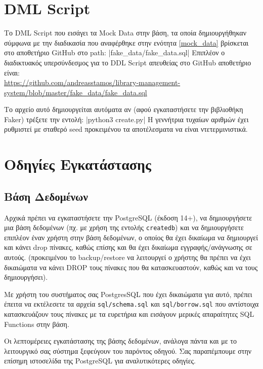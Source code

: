 \documentclass[a4paper]{article}
\begin{document}
\inputminted[breaklines,linenos]{sql}{../../sql/schema.sql}

\section{DML Script}

\par Το DML Script που εισάγει τα Mock Data στην βάση, τα οποία δημιουργήθηκαν σύμφωνα με την διαδικασία που αναφέρθηκε στην ενότητα \ref{mock_data} βρίσκεται στο αποθετήριο GitHub στο path:
|fake_data/fake_data.sql|
Επιπλέον ο διαδικτυακός υπερσύνδεσμος για το DDL Script απευθείας στο GitHub αποθετήριο είναι:\\
\url{https://github.com/andreasstamos/library-management-system/blob/master/fake_data/fake_data.sql}

\par Το αρχείο αυτό δημιουργείται αυτόματα αν (αφού εγκαταστήσετε την βιβλιοθήκη Faker) τρέξετε την εντολή:
|python3 create.py|
Η γεννήτρια τυχαίων αριθμών έχει ρυθμιστεί με σταθερό seed προκειμένου τα αποτέλεσματα να είναι ντετερμινιστικά.

\section{Οδηγίες Εγκατάστασης}

\subsection{Βάση Δεδομένων}
\label{install_db}
\par Αρχικά πρέπει να εγκαταστήσετε την PostgreSQL (έκδοση 14+), να δημιουργήσετε μια βάση δεδομένων (πχ. με χρήση της εντολής \texttt{createdb}) και να δημιουργήσετε επιπλέον έναν χρήστη στην βάση δεδομένων, ο οποίος θα έχει δικαίωμα να δημιουργεί και κάνει drop πίνακες, καθώς επίσης και θα έχει δικαίωμα εγγραφής/ανάγνωσης σε αυτούς. (προκειμένου το backup/restore να λειτουργεί ο χρήστης θα πρέπει να έχει δικαιώματα να κάνει DROP τους πίνακες που θα κατασκευαστούν, καθώς και να τους δημιουργήσει).
\par Με χρήστη του συστήματος σας PostgresSQL που έχει δικαιώματα για αυτό, πρέπει έπειτα να εκτέλεσετε τα αρχεία \texttt{sql/schema.sql} και \texttt{sql/borrow.sql} που αντίστοιχα κατασκευάζουν τους πίνακες με τα ευρετήρια και εισάγουν μερικές απαραίτητες SQL Functions στην βάση.

\par Οι λεπτομέρειες εγκατάστασης της βάσης δεδομένων, ανάλογα πάντα και με το λειτουργικό σας σύστημα ξεφεύγουν του παρόντος οδηγού. Σας παραπέμπουμε στην επίσημη ιστοσελίδα της PostgreSQL για αναλυτικότερες οδηγίες.
\end{document}

